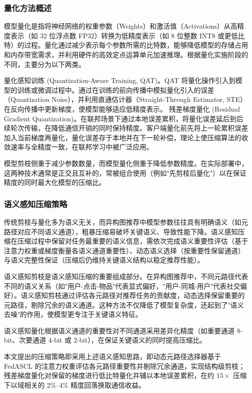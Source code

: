 \subsubsection{量化方法概述}
模型量化是指将神经网络的权重参数（Weights）和激活值（Activations）从高精度表示（如 32 位浮点数 FP32）转换为低精度表示（如 8 位整数 INT8 或更低比特）的过程。量化通过减少表示每个参数所需的比特数，能够降低模型的存储占用和内存带宽需求，并利用硬件的高效定点运算单元加速推理\cite{khan2025hufe}。根据量化实施阶段的不同，主要分为以下两类。
\begin{cnenumerate}
    \cnitem 量化感知训练 (Quantization-Aware Training, QAT)。QAT 将量化操作引入到模型的训练或微调过程中。通过在训练的前向传播中模拟量化引入的误差（Quantization Noise），并利用直通估计器（Straight-Through Estimator, STE）在反向传播中更新梯度，使模型能够适应低精度表示。
    \cnitem 残差梯度量化 (Residual Gradient Quantization)\cite{alistarh2017qsgd}。在联邦场景下通过本地误差累积，将量化误差延后到后续轮次传输，在降低通信开销的同时保持精度。客户端量化前先将上一轮累积误差加入当前梯度再量化，量化误差存于本地并在下一轮补偿，理论上使压缩算法的收敛速率与全精度一致，在联邦学习中被广泛应用\cite{yi2023fedlpq}。
\end{cnenumerate}
模型剪枝侧重于减少参数数量，而模型量化侧重于降低参数精度。在实际部署中，这两种技术通常是正交且互补的，常被组合使用（例如"先剪枝后量化"）以在保证精度的同时最大化模型的压缩比\cite{fedcomloc2025}。

\subsubsection{语义感知压缩策略}
传统剪枝与量化多为语义无关，而异构图推荐中模型参数往往具有明确语义（如元路径对应不同语义通道），粗暴压缩易破坏关键语义、导致性能下降。语义感知压缩在压缩过程中保留对任务最重要的语义信息，需依次完成语义重要性评估（基于注意力权重或梯度衡量各语义通道重要性）、动态语义选择（按重要性保留通道）与语义完整性保证（压缩后仍维持关键语义结构以稳定推荐性能）。

语义感知剪枝是语义感知压缩的重要组成部分。在异构图推荐中，不同元路径代表不同的语义关系（如"用户-点击-物品"代表显式偏好，"用户-同城-用户"代表社交偏好）。语义感知剪枝通过评估各元路径对推荐任务的贡献度，动态选择保留重要的元路径，剔除冗余的语义通道。这种方法不仅降低了模型复杂度，还起到了"语义去噪"的作用，使模型更专注于关键语义特征。

语义感知量化根据语义通道的重要性对不同通道采用差异化精度（如重要通道 8-bit、次要通道 4-bit 或 2-bit），在保证关键语义的同时提高压缩比。

本文提出的压缩策略即采用上述语义感知思路，即动态元路径选择器基于 FedASCL 的注意力权重评估各元路径重要性并剔除冗余通道，实现结构级剪枝；残差梯度量化对保留的梯度进行低比特量化并辅以本地误差累积，在约 $15\times$ 压缩下以域相关的 2\%--4\% 精度回落换取通信收益\cite{jiang2022fedmp, zhu2023fedlp, fedcomloc2025}。
